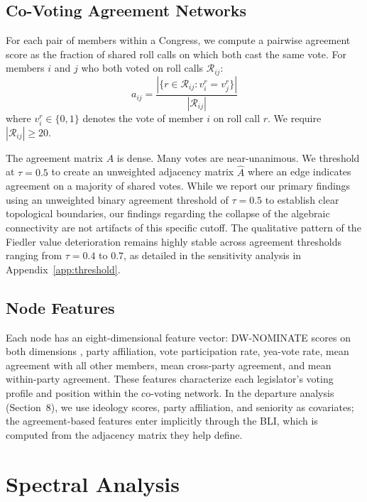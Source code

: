 \documentclass[12pt, a4paper]{article}
\begin{document}
\subsection{Co-Voting Agreement Networks}

For each pair of members within a Congress, we compute a pairwise agreement score as the fraction of shared roll calls on which both cast the same vote. For members $i$ and $j$ who both voted on roll calls $\mathcal{R}_{ij}$:
\begin{equation}
    a_{ij} = \frac{|\{r \in \mathcal{R}_{ij} : v_i^r = v_j^r\}|}{|\mathcal{R}_{ij}|}
\end{equation}
where $v_i^r \in \{0, 1\}$ denotes the vote of member $i$ on roll call $r$. We require $|\mathcal{R}_{ij}| \geq 20$.

The agreement matrix $A$ is dense. Many votes are near-unanimous. We threshold at $\tau = 0.5$ to create an unweighted adjacency matrix $\hat{A}$ where an edge indicates agreement on a majority of shared votes. While we report our primary findings using an unweighted binary agreement threshold of $\tau = 0.5$ to establish clear topological boundaries, our findings regarding the collapse of the algebraic connectivity are not artifacts of this specific cutoff. The qualitative pattern of the Fiedler value deterioration remains highly stable across agreement thresholds ranging from $\tau = 0.4$ to $0.7$, as detailed in the sensitivity analysis in Appendix~\ref{app:threshold}.

\subsection{Node Features}

Each node has an eight-dimensional feature vector: DW-NOMINATE scores on both dimensions \citep{poole2017}, party affiliation, vote participation rate, yea-vote rate, mean agreement with all other members, mean cross-party agreement, and mean within-party agreement. These features characterize each legislator's voting profile and position within the co-voting network. In the departure analysis (Section~8), we use ideology scores, party affiliation, and seniority as covariates; the agreement-based features enter implicitly through the BLI, which is computed from the adjacency matrix they help define.

\section{Spectral Analysis}
\end{document}
